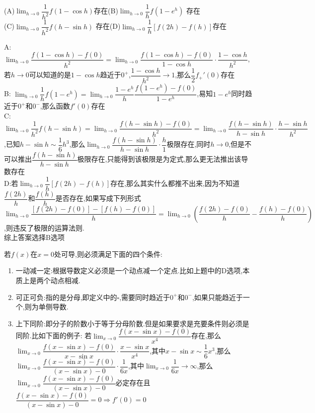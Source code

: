 \documentclass[8pt a4paper, oneside, UTF8]{ctexbook}  %
\begin{document}
\begin{sloppypar}
\begin{problem}
    (A)$\lim_{h\to0}\dfrac{1}{h^{2}}f(1-\cos h)$存在\quad(B)$\lim_{h\to0}\dfrac{1}{h}f(1-e^h)$ 存在\\
    (C)$\lim_{h\to0}\dfrac1{h^2}f(h-\sin h)$ 存在\quad(D)$\lim_{h\to0}\dfrac{1}{h}[f(2h)-f(h)]$存在
    \end{problem}
    \begin{solution}
        A: $\lim_{h \to 0}\dfrac{f(1 -\cos h)-f(0)}{h^2}=\lim_{h \to 0}\dfrac{f(1-\cos h)-f(0)}{1-\cos h}\cdot \dfrac{1-\cos h}{h^2}$,若$h \to 0$可以知道的是$1- \cos h$趋近于$0^+$,$\dfrac{1 - \cos h}{h^2} \to 1$,那么$\dfrac{1}{2}f_+'(0)$存在\\
        B: $\lim_{h \to 0}\dfrac{1}{h}f(1-e^h)=\lim_{h \to 0}\dfrac{1-e^h}{h}\dfrac{f(1-e^h)-f(0)}{1-e^h}$,易知$1-e^h$同时趋近于$0^+$和$0^-$,那么函数$f'(0)$存在\\
        C:$\lim_{h \to 0}\dfrac{1}{h^2}f(h- \sin h)=\lim_{h\to 0}\dfrac{f(h-\sin h)-f(0)}{h^2}=\lim_{h \to 0}\dfrac{f(h-\sin h)}{h -\sin h}\cdot \dfrac{h-\sin h}{h^2}$,已知$h -\sin h \sim \dfrac{1}{6}h^3$,那么$\lim_{h \to 0}\dfrac{f(h-\sin h)}{h -\sin h}\cdot \dfrac{h}{1}$极限存在,同时$h \to 0$,但是不可以推出$\dfrac{f(h-\sin h)}{h-\sin h}$极限存在,只能得到该极限是为定式,那么更无法推出该导数存在\\
        D:若$\lim_{h \to 0}\dfrac{1}{h}[f(2h)-f(h)]$存在,那么其实什么都推不出来,因为不知道$\dfrac{f(2h)}{h}$和$\dfrac{f(h)}{h}$是否存在,如果写成下列形式$\lim_{h \to 0}\dfrac{[f(2h)-f(0)]-[f(h)-f(0)]}{h}=\lim_{h \to 0}\left(\dfrac{f(2h)-f(0)}{h}-\dfrac{f(h)-f(0)}{h}\right)$,则违反了极限的运算法则.\\
        综上答案选择B选项
    \end{solution}
    \begin{conclusion}{若$f(x)$在$x=0$处可导,则必须满足下面的四个条件:}{}
        \begin{enumerate}
            \item 一动减一定:根据导数定义必须是一个动点减一个定点.比如上题中的D选项,本质上是两个动点相减.
            \item 可正可负:指的是分母,即定义中的$\square$,需要同时趋近于$0^+$和$0^-$,如果只能趋近于一个,则为单侧导数.
            \item 上下同阶:即分子的阶数小于等于分母阶数.但是如果要求是充要条件则必须是同阶.比如下面的例子:
                  若$\lim_{x\to 0}\dfrac{f(x-\sin x)-f(0)}{x^4}$存在,那么$\lim_{x\to 0}\dfrac{f(x-\sin x)-f(0)}{x-\sin x}\cdot \dfrac{x - \sin x}{x^4}$,其中$ x - \sin x \sim \dfrac{1}{6}x^3$,那么$\lim_{x\to 0}\dfrac{f(x-\sin x)-f(0)}{(x-\sin x)-0}\cdot \dfrac{1}{6x}$,其中$\lim_{x\to 0} \dfrac{1}{6x} \to \infty$,那么$\lim_{x\to 0}\dfrac{f(x-\sin x)-f(0)}{(x-\sin x)-0}$必定存在且$\dfrac{f(x-\sin x)-f(0)}{(x-\sin x)-0}=0 \Rightarrow f'(0)=0$

\end{enumerate}
\end{conclusion}
\end{sloppypar}
\end{document}
